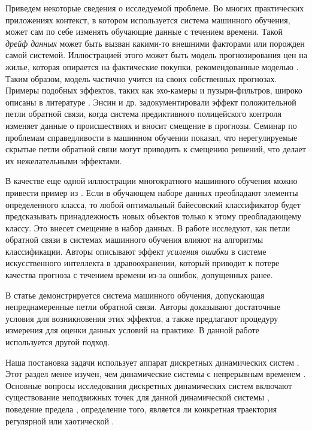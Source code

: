 Приведем некоторые сведения о исследуемой проблеме. Во многих практических приложениях контекст, в котором используется система машинного обучения, может сам по себе изменять обучающие данные с течением времени. Такой \emph{дрейф данных} может быть вызван какими-то внешними факторами или порожден самой системой. Иллюстрацией этого может быть модель прогнозирования цен на жилье, которая опирается на фактические покупки, рекомендованные моделью \cite{khritankov2021hidden}. Таким образом, модель частично учится на своих собственных прогнозах. Примеры подобных эффектов, таких как эхо-камеры и пузыри-фильтров, широко описаны в литературе \cite{davies2018redefining, spohr2017fake, michiels2022filter, khritankov2021existence}. Энсин и др. \cite{ensign2018runaway} задокументировали эффект положительной петли обратной связи, когда система предиктивного полицейского контроля изменяет данные о происшествиях и вносит смещение в прогнозы. Семинар по проблемам справедливости в машинном обучении \cite{chouldechova2020snapshot} показал, что нерегулируемые скрытые петли обратной связи могут приводить к смещению решений, что делает их нежелательными эффектами.

В качестве еще одной иллюстрации многократного машинного обучения можно привести пример из \cite{taori2023data}. Если в обучающем наборе данных преобладают элементы определенного класса, то любой оптимальный байесовский классификатор будет предсказывать принадлежность новых объектов только к этому преобладающему классу. Это внесет смещение в набор данных. В работе \cite{adam2022error} исследуют, как петли обратной связи в системах машинного обучения влияют на алгоритмы классификации. Авторы описывают эффект \textit{усиления ошибки} в системе искусственного интеллекта в здравоохранении, который приводит к потере качества прогноза с течением времени из-за ошибок, допущенных ранее.

В статье \cite{khritankov2023positive} демонстрируется система машинного обучения, допускающая непреднамеренные петли обратной связи. Авторы доказывают достаточные условия для возникновения этих эффектов, а также предлагают процедуру измерения для оценки данных условий на практике. В данной работе используется другой подход.

Наша постановка задачи использует аппарат дискретных динамических систем \cite{galor2007discrete, sandefur1990discrete}. Этот раздел менее изучен, чем динамические системы с непрерывным временем \cite{katok1995introduction, nemytskii2015qualitative, pauline2022observer, ouannas2017simple}. Основные вопросы исследования дискретных динамических систем включают существование неподвижных точек для данной динамической системы \cite{milnor2018analytic}, поведение предела \cite{sharma2015uniform}, определение того, является ли конкретная траектория регулярной или хаотической \cite{zhang2006discrete}. 